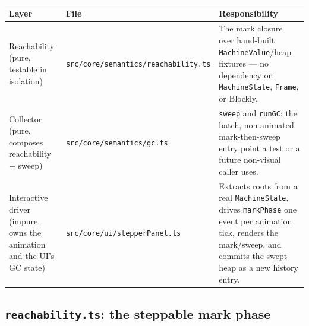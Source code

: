 \documentclass[11pt]{article}
\begin{document}
\begin{center}
\begin{tabular}{@{}p{3.6cm}p{5.6cm}p{5.6cm}@{}}
\toprule
\textbf{Layer} & \textbf{File} & \textbf{Responsibility} \\
\midrule
Reachability (pure, testable in isolation) &
  \texttt{src/core/semantics/}\linebreak\texttt{reachability.ts} &
  The mark closure over hand-built \texttt{MachineValue}/heap fixtures ---
  no dependency on \texttt{MachineState}, \texttt{Frame}, or Blockly. \\
Collector (pure, composes reachability + sweep) &
  \texttt{src/core/semantics/gc.ts} &
  \texttt{sweep} and \texttt{runGC}: the batch, non-animated
  mark-then-sweep entry point a test or a future non-visual caller uses. \\
Interactive driver (impure, owns the animation and the UI's GC state) &
  \texttt{src/core/ui/stepperPanel.ts} &
  Extracts roots from a real \texttt{MachineState}, drives
  \texttt{markPhase} one event per animation tick, renders the mark/sweep,
  and commits the swept heap as a new history entry. \\
\bottomrule
\end{tabular}
\end{center}

\subsection{\texttt{reachability.ts}: the steppable mark phase}
\end{document}
